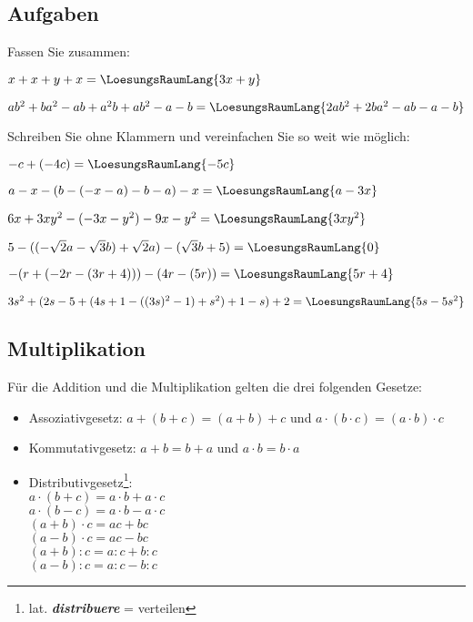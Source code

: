 \subsection*{Aufgaben}

Fassen Sie zusammen:
\begin{bbwAufgabenBlock}
\item $x+x+y+x = \LoesungsRaumLang{3x+y}$
\item $ab^2+ba^2 -ab + a^2b + ab^2 - a -b  = \LoesungsRaumLang{2ab^2 + 2ba^2 - ab - a - b}$
\end{bbwAufgabenBlock}

Schreiben Sie ohne Klammern und vereinfachen Sie so weit wie möglich:
\begin{bbwAufgabenBlock}
\item $-c+(-4c) = \LoesungsRaumLang{-5c}$
\item $a-x-(b-(-x-a)-b-a)-x = \LoesungsRaumLang{a-3x}$
\item $6x+3xy^2 -(-3x-y^2)-9x-y^2 = \LoesungsRaumLang{3xy^2}$
\item $5-((-\sqrt{2}a - \sqrt{3}b)+\sqrt{2}a)-(\sqrt{3}b+5)= \LoesungsRaumLang{0}$
\item $-(r+(-2r-(3r+4)))-(4r-(5r))=\LoesungsRaumLang{5r+4}$
\item $3s^2+(2s-5+(4s+1-((3s)^2-1)+s^2)+1-s)+2 = \LoesungsRaumLang{5s-5s^2}$
\end{bbwAufgabenBlock}
\newpage


\newpage
\subsection{Multiplikation}

Für die Addition und die Multiplikation gelten die drei folgenden
Gesetze:



\begin{gesetz}{}{}
\begin{itemize}
\item  Assoziativgesetz:
  $a+(b+c) = (a+b) +c$ und $a\cdot(b\cdot{}c) = (a\cdot b)\cdot c$
\item Kommutativgesetz:
  $a+b = b+a$ und $a\cdot b = b \cdot a$
\item Distributivgesetz\footnote{lat. \textit{\textbf{distribuere}} = verteilen}:\\
  $a\cdot (b+c) = a\cdot b + a\cdot c$\\
  $a\cdot (b-c) = a\cdot b - a\cdot c$\\
  $(a+b)\cdot c = ac + bc$\\
  $(a-b)\cdot c = ac - bc$\\
  $(a+b):c = a:c + b:c$\\
  $(a-b):c = a:c - b:c$\\
  
  \end{itemize}
\end{gesetz}

